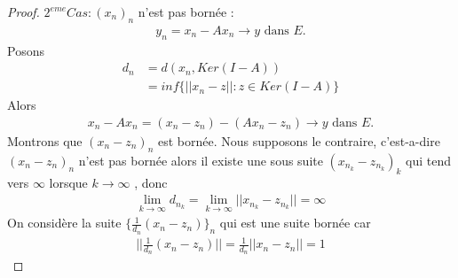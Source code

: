 \documentclass{report}
\begin{document}
{\begin{proof}
	 $2^{eme} Cas : (x_n)_n$ n'est pas bornée :
					\begin{align*}
	 				 y_n = x_n - Ax_n \rightarrow y \,\,\text{dans}\,\, E.
					\end{align*}
	 Posons 
					\begin{align*}
	 				 d_n &= d(x_n, Ker(I - A)) \\
	 				 &= inf\{||x_n -z|| : z \in Ker(I-A)\}
					\end{align*}
	 Alors 
					\begin{align*}
	 				 x_n -Ax_n = (x_n - z_n)-(Ax_n - z_n) \rightarrow y \,\,\text{dans}\,\, E.
					\end{align*}
	 Montrons que $(x_n - z_n)_n$ est bornée. Nous supposons le contraire, c'est-a-dire $(x_n - z_n)_n$ n'est pas bornée alors il existe une sous suite $(x_{n_k} - z_{n_k})_k$ qui tend vers $\infty$ lorsque $k \rightarrow \infty$ , donc 
					\begin{align*}
	 				 \lim_{k\rightarrow \infty} d_{n_k} = \lim_{k\rightarrow \infty} ||x_{n_k} - z_{n_k}|| = \infty 
					\end{align*}
	 On considère la suite $\{\frac{1}{d_n} (x_n - z_n)\}_n$ qui est une suite bornée car 
					\begin{align*}
	 				 ||\frac{1}{d_n} (x_n - z_n)|| = \frac{1}{d_n} ||x_n -z_n|| = 1 
					\end{align*}





\end{proof}}
\end{document}
